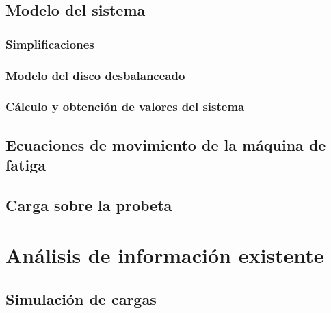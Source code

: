 \subsection{Modelo del sistema}
\subsubsection{Simplificaciones}
\subsubsection{Modelo del disco desbalanceado}
\subsubsection{Cálculo y obtención de valores del sistema}

\subsection{Ecuaciones de movimiento de la máquina de fatiga}

\subsection{Carga sobre la probeta}

\section{Análisis de información existente}
\subsection{Simulación de cargas}

